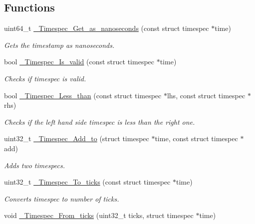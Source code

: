 \subsection*{Functions}
\begin{DoxyCompactItemize}
\item 
uint64\+\_\+t \mbox{\hyperlink{group__Timespec_ga380512dcd17fcd4d7d41e7291eacad7f}{\+\_\+\+Timespec\+\_\+\+Get\+\_\+as\+\_\+nanoseconds}} (const struct timespec $\ast$time)
\begin{DoxyCompactList}\small\item\em Gets the timestamp as nanoseconds. \end{DoxyCompactList}\item 
bool \mbox{\hyperlink{group__Timespec_gaa356c6f70683da692c46e41fcd75b412}{\+\_\+\+Timespec\+\_\+\+Is\+\_\+valid}} (const struct timespec $\ast$time)
\begin{DoxyCompactList}\small\item\em Checks if timespec is valid. \end{DoxyCompactList}\item 
bool \mbox{\hyperlink{group__Timespec_ga16c13224570044fc45d39c342bf3aaa3}{\+\_\+\+Timespec\+\_\+\+Less\+\_\+than}} (const struct timespec $\ast$lhs, const struct timespec $\ast$rhs)
\begin{DoxyCompactList}\small\item\em Checks if the left hand side timespec is less than the right one. \end{DoxyCompactList}\item 
uint32\+\_\+t \mbox{\hyperlink{group__Timespec_ga87611505342ef38778226f80e0258368}{\+\_\+\+Timespec\+\_\+\+Add\+\_\+to}} (struct timespec $\ast$time, const struct timespec $\ast$add)
\begin{DoxyCompactList}\small\item\em Adds two timespecs. \end{DoxyCompactList}\item 
uint32\+\_\+t \mbox{\hyperlink{group__Timespec_ga1aa89ad35c5fdabdef548cd32cf8a40f}{\+\_\+\+Timespec\+\_\+\+To\+\_\+ticks}} (const struct timespec $\ast$time)
\begin{DoxyCompactList}\small\item\em Converts timespec to number of ticks. \end{DoxyCompactList}\item 
void \mbox{\hyperlink{group__Timespec_ga457e50d3d65d2a890754fa88ccccc43e}{\+\_\+\+Timespec\+\_\+\+From\+\_\+ticks}} (uint32\+\_\+t ticks, struct timespec $\ast$time)

\end{DoxyCompactItemize}
